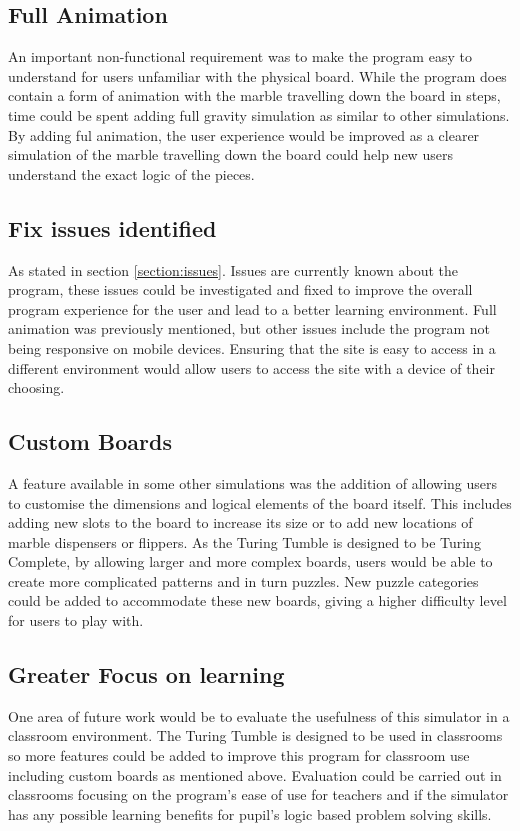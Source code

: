 \documentclass{l4proj}
\begin{document}
\subsection{Full Animation}
An important non-functional requirement was to make the program easy to understand for users unfamiliar with the physical board. While the program does contain a form of animation with the marble travelling down the board in steps, time could be spent adding full gravity simulation as similar to other simulations. By adding ful animation, the user experience would be improved as a clearer simulation of the marble travelling down the board could help new users understand the exact logic of the pieces.

\subsection{Fix issues identified}
As stated in section \ref{section:issues}. Issues are currently known about the program, these issues could be investigated and fixed to improve the overall program experience for the user and lead to a better learning environment. Full animation was previously mentioned, but other issues include the program not being responsive on mobile devices. Ensuring that the site is easy to access in a different environment would allow users to access the site with a device of their choosing.

\subsection{Custom Boards}
A feature available in some other simulations was the addition of allowing users to customise the dimensions and logical elements of the board itself. This includes adding new slots to the board to increase its size or to add new locations of marble dispensers or flippers. As the Turing Tumble is designed to be Turing Complete, by allowing larger and more complex boards, users would be able to create more complicated patterns and in turn puzzles. New puzzle categories could be added to accommodate these new boards, giving a higher difficulty level for users to play with.  

\subsection{Greater Focus on learning}
One area of future work would be to evaluate the usefulness of this simulator in a classroom environment. The Turing Tumble is designed to be used in classrooms so more features could be added to improve this program for classroom use including custom boards as mentioned above. Evaluation could be carried out in classrooms focusing on the program's ease of use for teachers and if the simulator has any possible learning benefits for pupil's logic based problem solving skills. 
\end{document}
